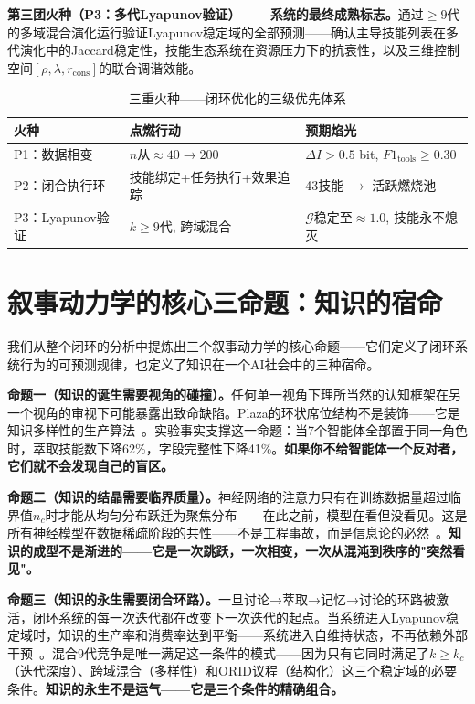 \documentclass[twocolumn,10.5pt]{ctexart}
\def\cG{\mathcal{G}}
\begin{document}
\textbf{第三团火种（P3：多代Lyapunov验证）——系统的最终成熟标志。}通过$\geq 9$代的多域混合演化运行验证Lyapunov稳定域的全部预测——确认主导技能列表在多代演化中的Jaccard稳定性，技能生态系统在资源压力下的抗衰性，以及三维控制空间$[\rho, \lambda, r_{\text{cons}}]$的联合调谐效能。

\begin{table}[t]
\centering
\caption{三重火种——闭环优化的三级优先体系}
\label{tab:priority_passionate}
\setlength{\tabcolsep}{2pt}
\renewcommand{\arraystretch}{1.15}
\begin{tabular}{lll}
\toprule
火种 & 点燃行动 & 预期焰光 \\
\midrule
P1：数据相变 & $n$从$\approx 40 \to 200$ & $\Delta I > 0.5$ bit, $F1_{\text{tools}} \geq 0.30$ \\
P2：闭合执行环 & 技能绑定+任务执行+效果追踪 & 43技能 $\to$ 活跃燃烧池 \\
P3：Lyapunov验证 & $k \geq 9$代, 跨域混合 & $\cG$稳定至$\approx 1.0$, 技能永不熄灭 \\
\bottomrule
\end{tabular}
\end{table}

\section{叙事动力学的核心三命题：知识的宿命}

我们从整个闭环的分析中提炼出三个叙事动力学的核心命题——它们定义了闭环系统行为的可预测规律，也定义了知识在一个AI社会中的三种宿命。

\textbf{命题一（知识的诞生需要视角的碰撞）。}任何单一视角下理所当然的认知框架在另一个视角的审视下可能暴露出致命缺陷。Plaza的环状席位结构不是装饰——它是知识多样性的生产算法~\cite{du2023improving}。实验事实支撑这一命题：当7个智能体全部置于同一角色时，萃取技能数下降62\%，字段完整性下降41\%。\textbf{如果你不给智能体一个反对者，它们就不会发现自己的盲区。}

\textbf{命题二（知识的结晶需要临界质量）。}神经网络的注意力只有在训练数据量超过临界值$n_c$时才能从均匀分布跃迁为聚焦分布——在此之前，模型在看但没看见。这是所有神经模型在数据稀疏阶段的共性——不是工程事故，而是信息论的必然~\cite{bai2018tcn}。\textbf{知识的成型不是渐进的——它是一次跳跃，一次相变，一次从混沌到秩序的"突然看见"。}

\textbf{命题三（知识的永生需要闭合环路）。}一旦讨论→萃取→记忆→讨论的环路被激活，闭环系统的每一次迭代都在改变下一次迭代的起点。当系统进入Lyapunov稳定域时，知识的生产率和消费率达到平衡——系统进入自维持状态，不再依赖外部干预~\cite{odling2003niche,laland2015extended}。混合9代竞争是唯一满足这一条件的模式——因为只有它同时满足了$k \geq k_c$（迭代深度）、跨域混合（多样性）和ORID议程（结构化）这三个稳定域的必要条件。\textbf{知识的永生不是运气——它是三个条件的精确组合。}
\end{document}
